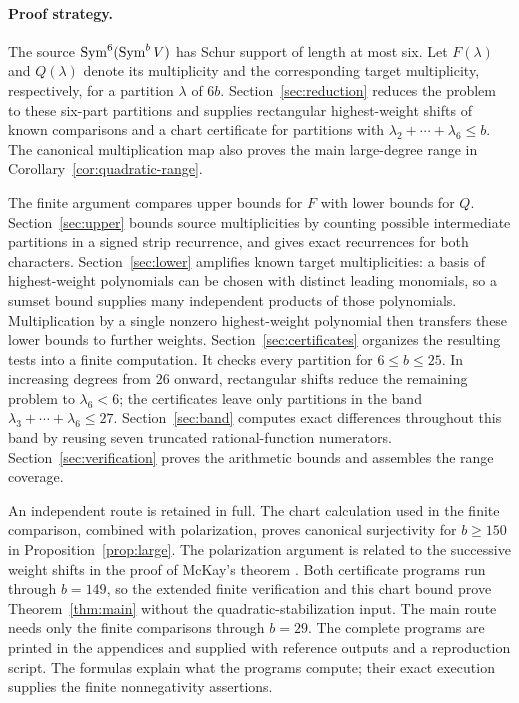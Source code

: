 \paragraph{Proof strategy.}
The source \(\operatorname{Sym}^6(\operatorname{Sym}^b V)\) has Schur support of length at most
six. Let \(F(\lambda)\) and \(Q(\lambda)\) denote its multiplicity and
the corresponding target multiplicity, respectively, for a partition
\(\lambda\) of \(6b\). Section~\ref{sec:reduction} reduces the problem
to these six-part partitions and supplies rectangular highest-weight
shifts of known comparisons and a chart certificate
for partitions with \(\lambda_2+\cdots+\lambda_6\le b\).
The canonical multiplication map also proves the main large-degree
range in Corollary~\ref{cor:quadratic-range}.

The finite argument compares upper bounds for \(F\) with lower bounds
for \(Q\). Section~\ref{sec:upper} bounds source multiplicities by
counting possible intermediate partitions in a signed strip recurrence,
and gives exact recurrences for both characters.
Section~\ref{sec:lower} amplifies known target multiplicities:
a basis of highest-weight polynomials can be chosen with distinct leading
monomials, so a sumset bound supplies many independent products of those
polynomials.
Multiplication by a single nonzero highest-weight polynomial then
transfers these lower bounds to further weights.
Section~\ref{sec:certificates} organizes the resulting tests into a
finite computation. It checks every partition for \(6\le b\le25\).
In increasing degrees from \(26\) onward, rectangular shifts reduce
the remaining problem to \(\lambda_6<6\); the certificates leave only
partitions in the band \(\lambda_3+\cdots+\lambda_6\le27\).
Section~\ref{sec:band} computes exact differences throughout this band
by reusing seven truncated rational-function numerators.
Section~\ref{sec:verification} proves the arithmetic bounds and
assembles the range coverage.

An independent route is retained in full. The chart calculation used
in the finite comparison, combined with polarization, proves canonical
surjectivity for \(b\ge150\) in Proposition~\ref{prop:large}.
The polarization argument is related to the successive weight shifts
in the proof of McKay's theorem \cite[Section~5]{Ikenmeyer2015}.
Both certificate programs run through \(b=149\), so the extended finite
verification and this chart bound prove Theorem~\ref{thm:main} without
the quadratic-stabilization input. The main route needs only the
finite comparisons through \(b=29\).
The complete programs are printed in the appendices and supplied with
reference outputs and a reproduction script. The formulas explain
what the programs compute; their exact execution supplies the finite
nonnegativity assertions.

